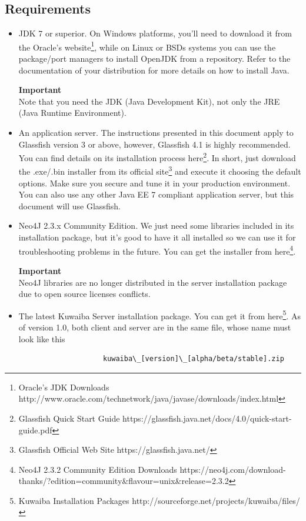 \documentclass[a4paper]{article}
\begin{document}
		\subsection{Requirements}
			\begin{itemize}
				\item JDK 7 or superior. On Windows platforms, you'll need to download it from the Oracle's website\footnote{Oracle's JDK Downloads http://www.oracle.com/technetwork/java/javase/downloads/index.html}, while on Linux or BSDs systems you can use the package/port managers to install OpenJDK from a repository. Refer to the documentation of your distribution for more details on how to install Java.
				\begin{framed} {\large \textbf{Important}} \\
					Note that you need the JDK (Java Development Kit), not only the JRE (Java Runtime Environment).
				\end{framed}
				\item An application server. The instructions presented in this document apply to Glassfish version 3 or above, however, Glassfish 4.1 is highly recommended. You can find details on its installation process here\footnote{Glassfish Quick Start Guide https://glassfish.java.net/docs/4.0/quick-start-guide.pdf}. In short, just download the .exe/.bin installer from its official site\footnote{Glassfish Official Web Site https://glassfish.java.net/} and execute it choosing the default options. Make sure you secure and tune it in your production environment. You can also use any other Java EE 7 compliant application server, but this document will use Glassfish.
				\item Neo4J 2.3.x Community Edition. We just need some libraries included in its installation package, but it's good to have it all installed so we can use it for troubleshooting problems in the future. You can get the installer from here\footnote {Neo4J 2.3.2 Community Edition Downloads https://neo4j.com/download-thanks/?edition=community\&flavour=unix\&release=2.3.2}.
				\begin{framed} {\large \textbf{Important}} \\
					Neo4J libraries are no longer distributed in the server installation package due to open source licenses conflicts.
				\end{framed}
				\item The latest Kuwaiba Server installation package. You can get it from here\footnote {Kuwaiba Installation Packages http://sourceforge.net/projects/kuwaiba/files/}. As of version 1.0, both client and server are in the same file, whose name must look like this 
		
				\begin{verbatim}
					kuwaiba\_[version]\_[alpha/beta/stable].zip
				\end{verbatim}
				
			\end{itemize}
		
\end{document}
